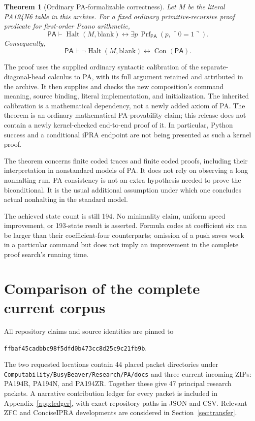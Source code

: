 \documentclass[10pt,letterpaper]{article}
\newtheorem{theorem}{Theorem}
\newcommand{\PA}{\mathsf{PA}}
\newcommand{\Con}{\operatorname{Con}}
\newcommand{\Halt}{\operatorname{Halt}}
\newcommand{\Prf}{\operatorname{Prf}}
\newcommand{\file}[1]{\nolinkurl{#1}}
\begin{document}
\begin{theorem}[Ordinary PA-formalizable correctness]
Let $M$ be the literal PA194N6 table in this archive. For a fixed ordinary
primitive-recursive proof predicate for first-order Peano arithmetic,
\[
 \PA\vdash \Halt(M,\mathrm{blank})
       \longleftrightarrow
       \exists p\,\Prf_{\PA}(p,\ulcorner0=1\urcorner).
\]
Consequently,
\[
 \boxed{\PA\vdash
       \neg\Halt(M,\mathrm{blank})\longleftrightarrow\Con(\PA).}
\]
\end{theorem}

The proof uses the supplied ordinary syntactic calibration of the
separate-diagonal-head calculus to PA, with its full argument retained and
attributed in the archive. It then supplies and checks the new composition's
command meaning, source binding, literal implementation, and initialization.
The inherited calibration is a mathematical dependency, not a newly added
axiom of PA. The theorem is an ordinary mathematical PA-provability claim;
this release does not contain a newly kernel-checked end-to-end proof of it.
In particular, Python success and a conditional iPRA endpoint are not being
presented as such a kernel proof.

The theorem concerns finite coded traces and finite coded proofs, including
their interpretation in nonstandard models of PA. It does not rely on
observing a long nonhalting run. PA consistency is not an extra hypothesis
needed to prove the biconditional. It is the usual additional assumption
under which one concludes actual nonhalting in the standard model.



The achieved state count is still 194. No minimality claim, uniform speed
improvement, or 193-state result is asserted. Formula codes at coefficient
six can be larger than their coefficient-four counterparts; omission of a
push saves work in a particular command but does not imply an improvement
in the complete proof search's running time.

\section{Comparison of the complete current corpus}
\label{sec:comparison}

All repository claims and source identities are pinned to
\begin{center}\small
\texttt{ffbaf45cadbbc98f5dfd0b473cc8d25c9c21fb9b}.
\end{center}
The two requested locations contain 44 placed packet directories under
\file{Computability/BusyBeaver/Research/PA/docs} and three current incoming
ZIPs: PA194R, PA194N, and PA194ZR. Together these give 47 principal research
packets. A narrative contribution ledger for every packet is included in
Appendix~\ref{app:ledger}, with exact repository paths in JSON and CSV.
Relevant ZFC and ConciseIPRA developments are considered in
Section~\ref{sec:transfer}.
\end{document}
